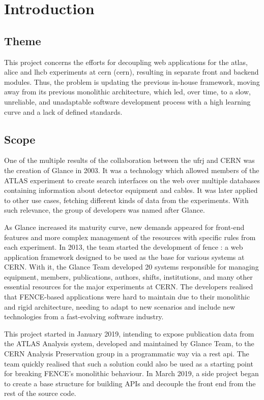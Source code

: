 \chapter{Introduction}
\label{chap1}

\section{Theme}

This project concerns the efforts for decoupling web applications for the \acrshort{atlas}, \acrshort{alice} and \acrshort{lhcb} experiments at \acrshort{cern} (\acrlong{cern}), resulting in separate front and backend modules. Thus, the problem is updating the previous in-house framework, moving away from its previous monolithic architecture, which led, over time, to a slow, unreliable, and unadaptable software development process with a high learning curve and a lack of defined standards.

\section{Scope}

One of the multiple results of the collaboration between the \acrfull{ufrj} and CERN was the creation of Glance \cite{grael-tcc} in 2003. It was a technology which allowed members of the ATLAS experiment to create search interfaces on the web over multiple databases containing information about detector equipment and cables. It was later applied to other use cases, fetching different kinds of data from the experiments. With such relevance, the group of developers was named after Glance.

As Glance increased its maturity curve, new demands appeared for front-end features and more complex management of the resources with specific rules from each experiment. In 2013, the team started the development of \acrfull{fence} \cite{lange-tcc}: a web application framework designed to be used as the base for various systems at CERN. With it, the Glance Team developed 20 systems responsible for managing equipment, members, publications, authors, shifts, institutions, and many other essential resources for the major experiments at CERN. The developers realised that FENCE-based applications were hard to maintain due to their monolithic and rigid architecture, needing to adapt to new scenarios and include new technologies from a fast-evolving software industry.

This project started in January 2019, intending to expose publication data from the ATLAS Analysis system, developed and maintained by Glance Team, to the CERN Analysis Preservation group in a programmatic way via a \acrshort{rest} \acrshort{api}. The team quickly realised that such a solution could also be used as a starting point for breaking FENCE’s monolithic behaviour. In March 2019, a side project began to create a base structure for building APIs and decouple the front end from the rest of the source code.

